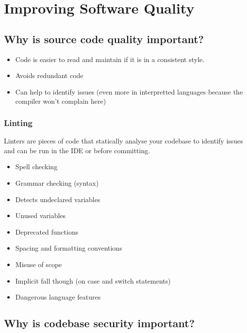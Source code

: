 \section{Improving Software Quality}\label{sec:improving_software_quality}

\subsection{Why is source code quality important?}\label{sub:why_is_source_code_quality_important_}

\begin{itemize}
	\item Code is easier to read and maintain if it is in a consistent style.
	\item Avoids redundant code
	\item Can help to identify issues (even more in interpretted languages because the compiler won't complain here)
\end{itemize}

\subsubsection{Linting}\label{ssub:linting}

Linters are pieces of code that statically analyse your codebase to identify issues and can be run in the IDE or before committing.

\begin{itemize}
	\item Spell checking
	\item Grammar checking (syntax)
	\item Detects undeclared variables
	\item Unused variables
	\item Deprecated functions
	\item Spacing and formatting conventions
	\item Misuse of scope
	\item Implicit fall though (on case and switch statements)
	\item Dangerous language features
\end{itemize}

\subsection{Why is codebase security important?}\label{sub:why_is_codebase_security_important_}

